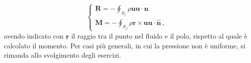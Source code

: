 \begin{equation}
\begin{cases}
 \bm{R} = -\displaystyle\oint_{S_f} \rho \bm{u} \bm{u} \cdot \bm{\hat{n}} \\
 \bm{M} = -\displaystyle\oint_{S_f} \rho \bm{r} \times \bm{u} \bm{u} \cdot \bm{\hat{n}}  \ ,
\end{cases}
\end{equation}
avendo indicato con $\bm{r}$ il raggio tra il punto nel fluido e il polo, rispetto al quale è calcolato il momento.
Per casi più generali, in cui la pressione non è uniforme, si rimanda allo svolgimento degli esercizi.


